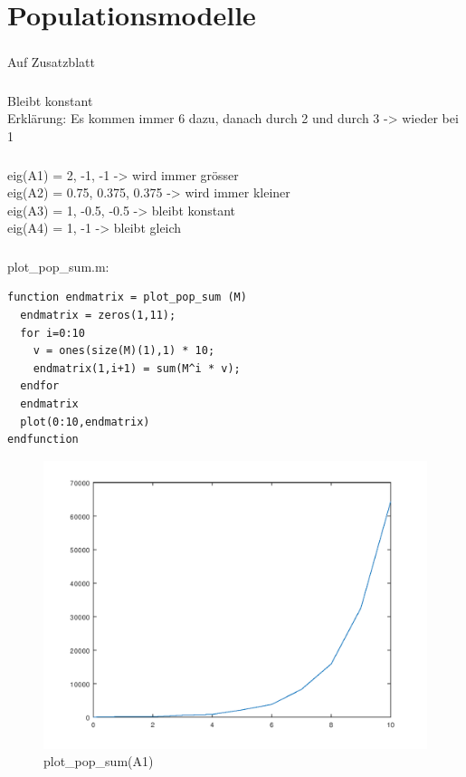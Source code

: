 \documentclass{article}
\begin{document}
\section{Populationsmodelle}
\subsubsection{}
Auf Zusatzblatt
\subsubsection{}
Bleibt konstant \\
Erklärung: Es kommen immer 6 dazu, danach durch 2 und durch 3 -> wieder bei 1
\subsubsection{}
eig(A1) = 2, -1, -1 -> wird immer grösser \\
eig(A2) = 0.75, 0.375, 0.375 -> wird immer kleiner \\
eig(A3) = 1, -0.5, -0.5 -> bleibt konstant \\
eig(A4) = 1, -1 -> bleibt gleich \\
\subsubsection{}
plot\_pop\_sum.m:
\begin{lstlisting}
function endmatrix = plot_pop_sum (M)
  endmatrix = zeros(1,11);
  for i=0:10
    v = ones(size(M)(1),1) * 10;
    endmatrix(1,i+1) = sum(M^i * v);
  endfor
  endmatrix
  plot(0:10,endmatrix)
endfunction
\end{lstlisting}

\begin{figure}[H]
\centering
\includegraphics[scale=0.6]{plotA1.png}
\caption{plot\_pop\_sum(A1)}
\label{fig:universe}
\end{figure}
\end{document}
